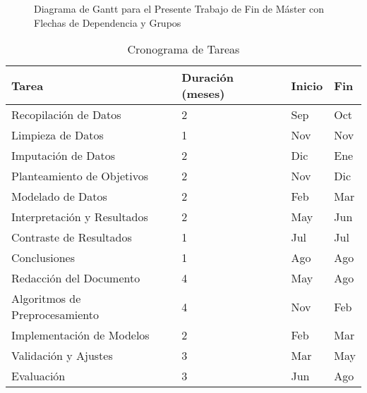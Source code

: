 \begin{figure}[H]
{\begin{ganttchart}
    

    \end{ganttchart}%
    }
    \caption{Diagrama de Gantt para el Presente Trabajo de Fin de Máster con Flechas de Dependencia y Grupos}
    \label{fig:gantt}
    \end{figure}


\begin{table}[ht]
    \label{tab:gantt}
    \centering
    \renewcommand{\arraystretch}{1.2} %
    \begin{tabular}{p{4cm} p{2.5cm} p{2.5cm} p{2.5cm}}
    \toprule
    \textbf{Tarea} & \textbf{Duración (meses)} & \textbf{Inicio} & \textbf{Fin} \\
    \midrule
    Recopilación de Datos          & 2 & Sep & Oct \\
    Limpieza de Datos              & 1 & Nov & Nov \\
    Imputación de Datos            & 2 & Dic & Ene \\
    Planteamiento de Objetivos     & 2 & Nov & Dic \\
    Modelado de Datos              & 2 & Feb & Mar \\
    Interpretación y Resultados    & 2 & May & Jun \\
    Contraste de Resultados        & 1 & Jul & Jul \\
    Conclusiones                   & 1 & Ago & Ago \\
    Redacción del Documento        & 4 & May & Ago \\
    Algoritmos de Preprocesamiento & 4 & Nov & Feb \\
    Implementación de Modelos      & 2 & Feb & Mar \\
    Validación y Ajustes           & 3 & Mar & May \\
    Evaluación                     & 3 & Jun & Ago \\
    \bottomrule
    \end{tabular}
    \caption{Cronograma de Tareas}
    \end{table}